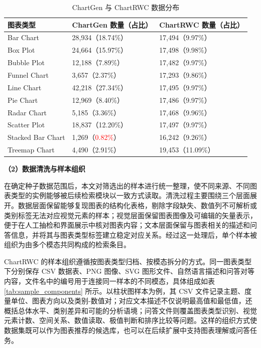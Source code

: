 \begin{table}[htbp]
\centering
\caption[ChartGen 与 ChartRWC 数据分布]{ChartGen 与 ChartRWC 数据分布}
\label{tab:Statistic}
\small
\begin{tabular*}{\textwidth}{@{\extracolsep{\fill}}lll@{}}
\toprule
图表类型 & ChartGen 数量（占比） & ChartRWC 数量（占比） \\
\midrule
Bar Chart & 28,934（18.74\%） & 17,494（9.97\%） \\
Box Plot & 24,664（15.97\%） & 17,498（9.98\%） \\
Bubble Plot & 12,188（7.89\%） & 17,482（9.97\%） \\
Funnel Chart & 3,657（2.37\%） & 17,293（9.86\%） \\
Line Chart & 42,218（\textcolor{green!50!black}{27.34\%}） & 17,495（9.97\%） \\
Pie Chart & 12,969（8.40\%） & 17,486（9.97\%） \\
Radar Chart & 5,185（3.36\%） & 17,468（9.96\%） \\
Scatter Plot & 18,837（12.20\%） & 17,497（9.97\%） \\
Stacked Bar Chart & 1,269（\textcolor{red}{0.82\%}） & 16,242（9.26\%） \\
Treemap Chart & 4,490（2.91\%） & 19,453（11.09\%） \\
\bottomrule
\end{tabular*}
\end{table}

\noindent\textbf{（2）数据清洗与样本组织}

在确定种子数据范围后，本文对筛选出的样本进行统一整理，使不同来源、不同图表类型的实例能够被后续检索模块以一致方式读取。清洗过程主要围绕三个层面展开。数据层面保留能够复现图表的结构化表格，剔除字段缺失、数值列不可解析或类别标签无法对应视觉元素的样本；视觉层面保留图表图像及可编辑的矢量表示，便于在人工抽检和界面展示中核对图表内容；文本层面保留与图表相关的描述和问答信息，并将其与图表类型标签建立稳定对应关系。经过这一处理后，单个样本被组织为由多个模态共同构成的检索条目。

ChartRWC 的样本组织遵循按图表类型归档、按模态拆分的方式。同一图表类型下分别保存 CSV 数据表、PNG 图像、SVG 图形文件、自然语言描述和问答对等内容，文件名中的编号用于连接同一样本的不同模态，具体组成如表\ref{tab:sample_components} 所示。以柱状图样本为例，其 CSV 文件记录主题、度量单位、图表方向以及类别-数值对；对应文本描述不仅说明最高值和最低值，还概括总体水平、类别差异和可能的分析语境；问答文件则覆盖图表类型识别、视觉元素计数、空间关系、数值读取、极值判断和排序比较等问题。这样的组织方式使数据集既可以作为图表推荐的候选库，也可以在后续扩展中支持图表理解或问答任务。

